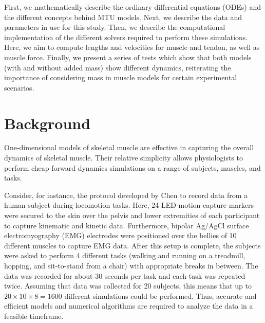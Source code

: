 \documentclass{sfuthesis}
\numberwithin{equation}{section}
\numberwithin{figure}{chapter}
\numberwithin{table}{chapter}
\theoremstyle{definition}
\begin{document}
First, we mathematically describe the ordinary differential equations (ODEs) and the different concepts behind MTU models. Next, we describe the data and parameters in use for this study. Then, we describe the computational implementation of the different solvers required to perform these simulations. Here, we aim to compute lengths and velocities for muscle and tendon, as well as muscle force. Finally, we present a series of tests which show that both models (with and without added mass) show different dynamics, reiterating the importance of considering mass in muscle models for certain experimental scenarios.

\section{Background}

One-dimensional models of skeletal muscle are effective in capturing the overall dynamics of skeletal muscle. Their relative simplicity allows physiologists to perform cheap forward dynamics simulations on a range of subjects, muscles, and tasks.

Consider, for instance, the protocol developed by Chen \cite{EvanThesis} to record data from a human subject during locomotion tasks. Here, 24 LED motion-capture markers were secured to the skin over the pelvis and lower extremities of each participant to capture kinematic and kinetic data. Furthermore, bipolar Ag/AgCl surface electromyography (EMG) electrodes were positioned over the bellies of 10 different muscles to capture EMG data. After this setup is complete, the subjects were asked to perform 4 different tasks (walking and running on a treadmill, hopping, and sit-to-stand from a chair) with appropriate breaks in between. The data was recorded for about 30 seconds per task and each task was repeated twice. Assuming that data was collected for 20 subjects, this means that up to $20 \times 10 \times 8 = 1600$ different simulations could be performed. Thus, accurate and efficient models and numerical algorithms are required to analyze the data in a feasible timeframe.
\end{document}
